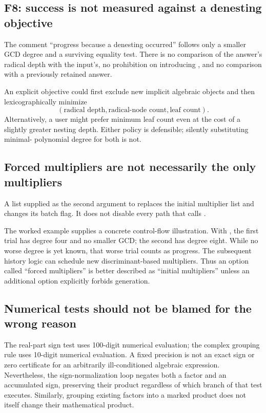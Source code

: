 \documentclass[11pt,letterpaper]{article}
\newcommand{\code}[1]{\texttt{\detokenize{#1}}}
\theoremstyle{definition}
\begin{document}
\subsection{F8: success is not measured against a denesting objective}
The comment ``progress because a denesting occurred'' follows only a smaller GCD
degree and a surviving equality test. There is no comparison of the answer's
radical depth with the input's, no prohibition on introducing \code{Root}, and no
comparison with a previously retained answer.

An explicit objective could first exclude new implicit algebraic objects and then
lexicographically minimize
\[
  (\text{radical depth},\text{radical-node count},\text{leaf count}).
\]
Alternatively, a user might prefer minimum leaf count even at the cost of a slightly
greater nesting depth. Either policy is defensible; silently substituting minimal-
polynomial degree for both is not.

\subsection{Forced multipliers are not necessarily the only multipliers}
A list supplied as the second argument to \code{denest11} replaces the initial
multiplier list and changes its batch flag. It does not disable every path that
calls \code{newmultipliers}.

The worked example supplies a concrete control-flow illustration. With
\code{{1, Sqrt[5]}}, the first trial has degree four and no smaller GCD; the second
has degree eight. While no worse degree is yet known, that worse trial counts as
progress. The subsequent history logic can schedule new discriminant-based
multipliers. Thus an option called ``forced multipliers'' is better described as
``initial multipliers'' unless an additional option explicitly forbids generation.

\subsection{Numerical tests should not be blamed for the wrong reason}
The real-part sign test uses 100-digit numerical evaluation; the complex grouping
rule uses 10-digit numerical evaluation. A fixed precision is not an exact sign or
zero certificate for an arbitrarily ill-conditioned algebraic expression.
Nevertheless, the sign-normalization loop negates both a factor and an accumulated
sign, preserving their product regardless of which branch of that test executes.
Similarly, grouping existing factors into a marked product does not itself change
their mathematical product.
\end{document}
